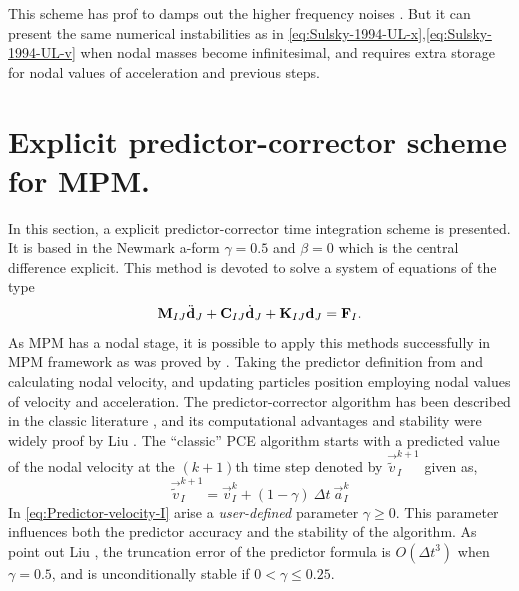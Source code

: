 This scheme has prof to damps out the higher frequency noises
\cite{Tran2019e}. But it can present the same numerical instabilities
as in \eqref{eq:Sulsky-1994-UL-x},\eqref{eq:Sulsky-1994-UL-v} when
nodal masses become infinitesimal, and requires extra storage for
nodal values of acceleration and previous steps.  

\section{Explicit predictor-corrector scheme for MPM.}
\label{sec:epc-algor-mpm}

In this section, a explicit predictor-corrector time integration
scheme is presented. It is based in the Newmark a-form 
$\gamma = 0.5$ and $\beta = 0$ which is the central difference
explicit. This method is devoted to solve a system of equations of the type
\begin{equation*}
  \mathbf{{M}}_{IJ}\ddot{\mathbf{{d}}}_{J} + \mathbf{{C}}_{IJ}\dot{\mathbf{{d}}}_{J} +
  \mathbf{{K}}_{IJ}\mathbf{{d}}_{J} = \mathbf{{F}}_{I}.
\end{equation*}
As MPM has a nodal stage, it is possible to apply this methods
successfully in MPM framework as was proved by
\cite{Tran2019e}. Taking the predictor definition from and calculating
nodal velocity, and updating particles position employing nodal values
of velocity and acceleration. The predictor-corrector algorithm has
been described in the classic literature \cite{Hughes2000}, and its
computational advantages and stability were widely proof by Liu
\cite{Xiaojian94}. The ``classic'' PCE algorithm starts with a
predicted value of the nodal velocity at the $(k+1)$th time step denoted by $\vec{\tilde{v}}_I^{k+1}$ given as,
\begin{equation}
  \label{eq:Predictor-velocity-I}
  \vec{\tilde{v}}_I^{k+1} = \vec{v}_I^k + (1 - \gamma)\ \Delta t\ \vec{a}_I^k
\end{equation}
In \eqref{eq:Predictor-velocity-I} arise a \textit{user-defined}
parameter $\gamma \geq 0$. This parameter influences both the predictor accuracy
and the stability of the algorithm. As point out Liu
\cite{Xiaojian94}, the truncation error of the predictor formula is
$O(\Delta t^3)$ when $\gamma = 0.5$, and is unconditionally stable if
$ 0 < \gamma \leq 0.25$.

